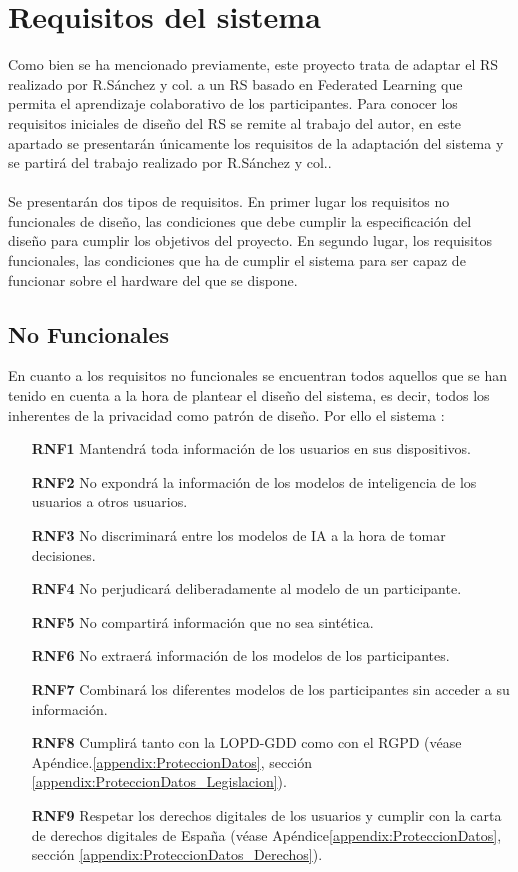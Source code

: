\section{Requisitos del sistema}
Como bien se ha mencionado previamente, este proyecto trata de adaptar el RS realizado por R.Sánchez y col.\autocite{sanchez-corcueraPersuasionbasedRecommenderSystem2020} a un RS basado en Federated Learning que permita el aprendizaje colaborativo de los participantes. Para conocer los requisitos iniciales de diseño del RS se remite al trabajo del autor, en este apartado se presentarán únicamente los requisitos de la adaptación del sistema y se partirá del trabajo realizado por R.Sánchez y col.. 
\\ \\
Se presentarán dos tipos de requisitos. En primer lugar los requisitos no funcionales de diseño, las condiciones que debe cumplir la especificación del diseño para cumplir los objetivos del proyecto. En segundo lugar, los requisitos funcionales, las condiciones que ha de cumplir el sistema para ser capaz de funcionar sobre el hardware del que se dispone.

\subsection{No Funcionales}
En cuanto a los requisitos no funcionales se encuentran todos aquellos que se han tenido en cuenta a la hora de plantear el diseño del sistema, es decir, todos los inherentes de la privacidad como patrón de diseño. Por ello el sistema :
\begin{itemize}
    \item [\textbf{RNF1}] Mantendrá toda información de los usuarios en sus dispositivos.
    \item [\textbf{RNF2}] No expondrá la información de los modelos de inteligencia de los usuarios a otros usuarios.
    \item [\textbf{RNF3}] No discriminará entre los modelos de IA a la hora de tomar decisiones.
    \item [\textbf{RNF4}] No perjudicará deliberadamente al modelo de un participante.
    \item [\textbf{RNF5}] No compartirá información que no sea sintética.
    \item [\textbf{RNF6}] No extraerá información de los modelos de los participantes.
    \item [\textbf{RNF7}] Combinará los diferentes modelos de los participantes sin acceder a su información.
    \item [\textbf{RNF8}] Cumplirá tanto con la LOPD-GDD como con el RGPD (véase Apéndice.\ref{appendix:ProteccionDatos}, sección \ref{appendix:ProteccionDatos_Legislacion}).
    \item [\textbf{RNF9}] Respetar los derechos digitales de los usuarios y cumplir con la carta de derechos digitales de España (véase Apéndice\ref{appendix:ProteccionDatos}, sección \ref{appendix:ProteccionDatos_Derechos}).
\end{itemize}
